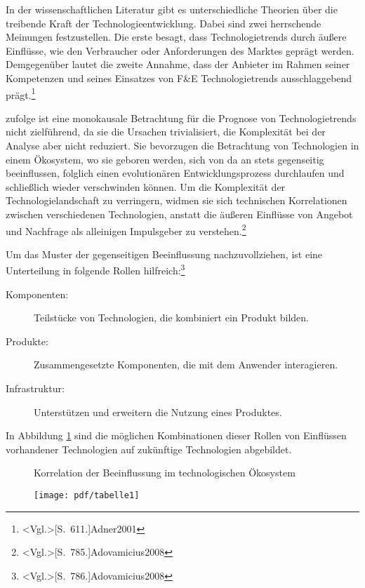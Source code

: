 In der wissenschaftlichen Literatur gibt es unterschiedliche Theorien über die treibende Kraft der Technologieentwicklung. Dabei sind zwei herrschende Meinungen festzustellen. Die erste besagt, dass Technologietrends durch äußere Einflüsse, wie den Verbraucher oder Anforderungen des Marktes geprägt werden. Demgegenüber lautet die zweite Annahme, dass der Anbieter im Rahmen seiner Kompetenzen und seines Einsatzes von F\&E Technologietrends ausschlaggebend prägt.\footnote{\citeNP<Vgl.>[S.~611.]{Adner2001}}

 zufolge ist eine monokausale Betrachtung für die Prognose von Technologietrends nicht zielführend, da sie die Ursachen trivialisiert, die Komplexität bei der Analyse aber nicht reduziert. Sie bevorzugen die Betrachtung von Technologien in einem Ökosystem, wo sie geboren werden, sich von da an stets gegenseitig beeinflussen, folglich einen evolutionären Entwicklungsprozess durchlaufen und schließlich wieder verschwinden können. Um die Komplexität der Technologielandschaft zu verringern, widmen sie sich technischen Korrelationen zwischen verschiedenen Technologien, anstatt die äußeren Einflüsse von Angebot und Nachfrage als alleinigen Impulsgeber zu verstehen.\footnote{\citeNP<Vgl.>[S.~785.]{Adovamicius2008}}

Um das Muster der gegenseitigen Beeinflussung nachzuvollziehen, ist eine Unterteilung in folgende Rollen hilfreich:\footnote{\citeNP<Vgl.>[S.~786.]{Adovamicius2008}}
\begin{description}
	\item[Komponenten:] Teilstücke von Technologien, die kombiniert ein Produkt bilden.
	\item[Produkte:] Zusammengesetzte Komponenten, die mit dem Anwender interagieren.
	\item[Infrastruktur:] Unterstützen und erweitern die Nutzung eines Produktes.
\end{description}

In Abbildung \ref{fig:influence_path} sind die möglichen Kombinationen dieser Rollen von Einflüssen vorhandener Technologien auf zukünftige Technologien abgebildet.

\begin{figure}[h]
	\centering
	\caption{Korrelation der Beeinflussung im technologischen Ökosystem}
	\texttt{[image: pdf/tabelle1]}
	\caption*{\protect\citeNP<Quelle: In Anlehnung an>[S.~785]{Adovamicius2008}}
	\label{fig:influence_path}
\end{figure}

